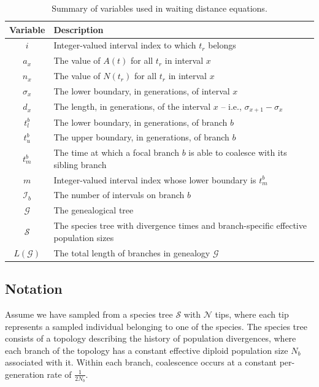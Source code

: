\documentclass[11pt]{article}
\begin{document}
\begin{table}[h]
\centering
\caption{\label{tab:table-3} 
	Summary of variables used in waiting distance equations. 
}
\begin{tabular}[t]{ |c|l| }
	\toprule
	Variable & Description \\
	\midrule
	$i$          & Integer-valued interval index to which $t_r$ belongs      \\
	$a_x$      & The value of $A(t)$ for all $t_r$ in interval $x$   \\	
	$n_x$          & The value of $N(t_r)$ for all $t_r$ in interval $x$      \\ 
	$\sigma_x$  & The lower boundary, in generations, of interval $x$ \\
	$d_x$      & The length, in generations, of the interval $x$ -- i.e., $\sigma_{x+1} - \sigma_{x}$   \\
	$t_l^b$ & The lower boundary, in generations, of branch $b$  \\
	$t_u^b$ & The upper boundary, in generations, of branch $b$ \\
	$t_m^b$ & The time at which a focal branch $b$ is able to coalesce with its sibling branch \\
	$m$ & Integer-valued interval index whose lower boundary is $t_m^b$ \\
	$\mathcal{I}_b$          & The number of intervals on branch $b$  \\
	$\mathcal{G}$          & The genealogical tree \\
	$\mathcal{S}$   & The species tree with divergence times and branch-specific effective population sizes  \\
	$L(\mathcal{G})$ & The total length of branches in genealogy $\mathcal{G}$ \\
	\bottomrule
\end{tabular}
\end{table}


\subsection{Notation}

Assume we have sampled from a species tree $\mathcal{S}$ with $\mathcal{N}$ tips, where 
each tip represents a sampled individual belonging to one of the species. The species tree 
consists of a topology describing the history of population divergences, where each branch 
of the topology has a constant effective diploid population size $N_b$ associated with it. 
Within each branch, coalescence occurs at a constant per-generation rate of $\frac{1}{2N_b}$. 
\end{document}
